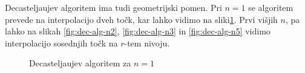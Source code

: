 \documentclass[isrm2, tisk]{fmfdelo}
\begin{document}
    Decasteljaujev algoritem ima tudi geometrijski pomen.
    Pri $n=1$ se algoritem prevede na interpolacijo dveh točk, kar lahko vidimo na sliki\ref{fig:dec-alg-n1}.
    Prvi višjih $n$, pa lahko na slikah \ref{fig:dec-alg-n2}, \ref{fig:dec-alg-n3} in \ref{fig:dec-alg-n5} vidimo interpolacijo sosednjih točk na $r$-tem nivoju.
    \begin{figure}[h!]
        \captionsetup[subfigure]{labelformat=empty}
        \centering
        \qquad
        \qquad
        \qquad
        \caption{Decasteljaujev algoritem za $n=1$}
        \label{fig:dec-alg-n1}
    \end{figure}
\end{document}
